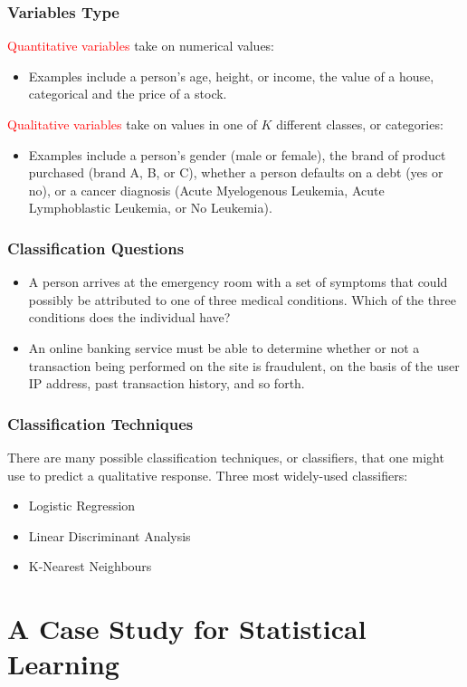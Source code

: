 \documentclass{beamer}
\begin{document}
\frame
{\frametitle{Variables Type}

\textcolor{red}{Quantitative variables} take on numerical  values:

\begin{itemize}
  \item  Examples include a person's age, height, or income, the value of a house,
 categorical and the price of a stock.
\end{itemize}

 \vspace{0.5cm}
\textcolor{red}{Qualitative variables} take on values in one of $K$ different classes,  or categories:

\begin{itemize}
  \item  Examples include a person's gender (male or female), the brand of product purchased (brand A,  B, or C), whether a person defaults on a debt (yes or no), or a cancer diagnosis (Acute Myelogenous Leukemia, Acute Lymphoblastic Leukemia, or No Leukemia).
\end{itemize}

}


\frame
{\frametitle{Classification Questions}
\begin{itemize}
\item  A person arrives at the emergency room with a set of  symptoms
that could possibly be attributed to one of three medical conditions.
Which of the three conditions does the individual have?
\item  An online banking service must be able to determine whether or not a transaction being performed on the site is fraudulent, on the basis of the user IP address, past transaction history, and so forth.
\end{itemize}
}

\frame
{\frametitle{Classification Techniques}

There are many possible classiﬁcation techniques, or classiﬁers, that one might use to predict a qualitative response.  Three most widely-used classifiers:

\begin{itemize}
  \item Logistic Regression
  \item Linear Discriminant Analysis
  \item K-Nearest Neighbours
\end{itemize}
}


\section{A Case Study for Statistical Learning}
\end{document}
